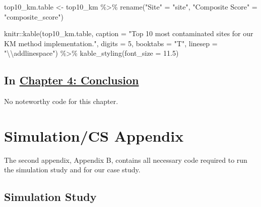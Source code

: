 \documentclass[12pt, twoside]{amherstthesis}
\newenvironment{Shaded}{\begin{snugshade}}{\end{snugshade}}
\newcommand{\AttributeTok}[1]{\textcolor[rgb]{0.77,0.63,0.00}{#1}}
\newcommand{\DecValTok}[1]{\textcolor[rgb]{0.00,0.00,0.81}{#1}}
\newcommand{\FloatTok}[1]{\textcolor[rgb]{0.00,0.00,0.81}{#1}}
\newcommand{\FunctionTok}[1]{\textcolor[rgb]{0.00,0.00,0.00}{#1}}
\newcommand{\NormalTok}[1]{#1}
\newcommand{\OtherTok}[1]{\textcolor[rgb]{0.56,0.35,0.01}{#1}}
\newcommand{\SpecialCharTok}[1]{\textcolor[rgb]{0.00,0.00,0.00}{#1}}
\newcommand{\StringTok}[1]{\textcolor[rgb]{0.31,0.60,0.02}{#1}}
\begin{document}
\begin{Shaded}
\begin{Highlighting}[]
\NormalTok{top10\_km.table }\OtherTok{\textless{}{-}}\NormalTok{ top10\_km }\SpecialCharTok{\%\textgreater{}\%}
  \FunctionTok{rename}\NormalTok{(}\StringTok{"Site"} \OtherTok{=} \StringTok{"site"}\NormalTok{, }
         \StringTok{"Composite Score"} \OtherTok{=} \StringTok{"composite\_score"}\NormalTok{)}

\NormalTok{knitr}\SpecialCharTok{::}\FunctionTok{kable}\NormalTok{(top10\_km.table, }
  \AttributeTok{caption =} \StringTok{"Top 10 most contaminated sites }
\StringTok{  for our KM method implementation."}\NormalTok{, }
             \AttributeTok{digits =} \DecValTok{5}\NormalTok{, }\AttributeTok{booktabs =} \StringTok{"T"}\NormalTok{, }
  \AttributeTok{linesep =} \StringTok{"}\SpecialCharTok{\textbackslash{}\textbackslash{}}\StringTok{addlinespace"}\NormalTok{) }\SpecialCharTok{\%\textgreater{}\%}
  \FunctionTok{kable\_styling}\NormalTok{(}\AttributeTok{font\_size =} \FloatTok{11.5}\NormalTok{) }
\end{Highlighting}
\end{Shaded}
\hypertarget{in-chapter-4-conclusion}{%
\section{\texorpdfstring{In \protect\hyperlink{conclusion}{Chapter 4: Conclusion}}{In Chapter 4: Conclusion}}\label{in-chapter-4-conclusion}}

No noteworthy code for this chapter.

\hypertarget{simulationcs-appendix}{%
\chapter{Simulation/CS Appendix}\label{simulationcs-appendix}}

The second appendix, Appendix B, contains all necessary code required to run the simulation study and for our case study.

\hypertarget{simulation-study}{%
\section{Simulation Study}\label{simulation-study}}
\end{document}
